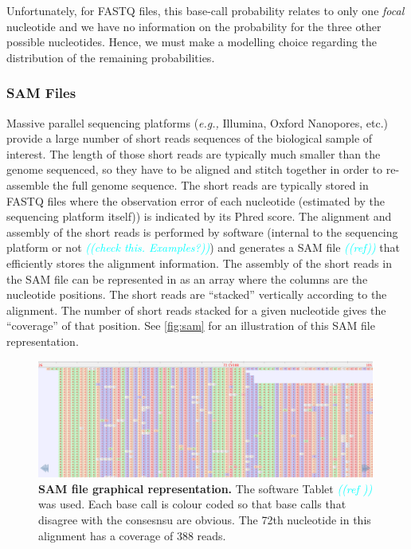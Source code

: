 \documentclass[
]{article}
\newcommand{\comment}[1]{\textsl{\textcolor{cyan}{((#1))}}}
\newcommand{\eg}{\textit{e.g.,}\xspace}
\begin{document}
Unfortunately, for FASTQ files, this base-call probability relates to
only one \emph{focal} nucleotide and we have no information on the
probability for the three other possible nucleotides. Hence, we must
make a modelling choice regarding the distribution of the remaining
probabilities.

\hypertarget{sam-files}{%
\subsubsection{SAM Files}\label{sam-files}}

Massive parallel sequencing platforms (\eg Illumina, Oxford Nanopores,
etc.) provide a large number of short reads sequences of the biological
sample of interest. The length of those short reads are typically much
smaller than the genome sequenced, so they have to be aligned and stitch
together in order to re-assemble the full genome sequence. The short
reads are typically stored in FASTQ files where the observation error of
each nucleotide (estimated by the sequencing platform itself)) is
indicated by its Phred score. The alignment and assembly of the short
reads is performed by software (internal to the sequencing platform or
not \comment{check this. Examples?}) and generates a SAM file
\comment{ref} that efficiently stores the alignment information. The
assembly of the short reads in the SAM file can be represented in as an
array where the columns are the nucleotide positions. The short reads
are ``stacked'' vertically according to the alignment. The number of
short reads stacked for a given nucleotide gives the ``coverage'' of
that position. See \autoref{fig:sam} for an illustration of this SAM
file representation.

\begin{figure}[ht]
\centering
    \includegraphics[width=0.99\textwidth]{../ms/figs/sam-tablet.png}
\caption{\textbf{SAM file graphical representation.} The software Tablet \comment{ref } was used. Each base call is colour coded so that base calls that disagree with the consesnsu are obvious. The 72th nucleotide in this alignment has a coverage of 388 reads.}
\label{fig:sam}
\end{figure}
\end{document}

